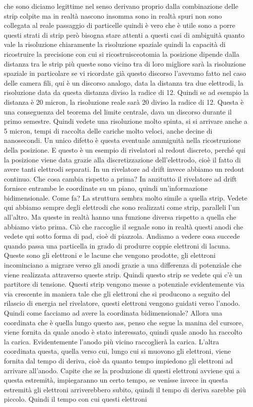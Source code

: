 che sono diciamo legittime nel senso derivano proprio dalla combinazione delle strip colpite ma in realtà nascono insomma sono in realtà spuri non sono collegata al reale passaggio di particelle quindi è vero che è utile sono a porre questi strati di strip però bisogna stare attenti a questi casi di ambiguità quanto vale la risoluzione chiaramente la risoluzione spaziale quindi la capacità di ricostruire la precisione con cui si ricostruisceotomia la posizione dipende dalla distanza tra le strip più queste sono vicino tra di loro migliore sarà la risoluzione spaziale in particolare se vi ricordate già questo discorso l'avevamo fatto nel caso delle camera fili, qui è un discorso analogo, data la distanza tra due elettrodi, la risoluzione data da questa distanza diviso la radice di 12. Quindi se ad esempio la distanza è 20 micron, la risoluzione reale sarà 20 diviso la radice di 12. Questa è una conseguenza del teorema del limite centrale, dava un discorso durante il primo semestre. Quindi vedete una risoluzione molto spinta, si si arrivare anche a 5 micron, tempi di raccolta delle cariche molto veloci, anche decine di nanosecondi. Un unico difetto è questa eventuale ammiguità nella ricostruzione della posizione. E questo è un esempio di rivelatori al redout discreto, perché qui la posizione viene data grazie alla discretizzazione dell'elettrodo, cioè il fatto di avere tanti elettrodi separati. In un rivelatore ad drift invece abbiamo un redout continuo. Che cosa cambia rispetto a prima? In anzitutto il rivelatore ad drift fornisce entrambe le coordinate su un piano, quindi un'informazione bidimensionale. Come fa? La struttura sembra molto simile a quella strip. Vedete qui abbiamo sempre degli elettrodi che sono realizzati come strip, paralleli l'un all'altro. Ma queste in realtà hanno una funzione diversa rispetto a quella che abbiamo visto prima. Ciò che raccoglie il segnale sono in realtà questi anodi che vedete qui sotto forma di pad, cioè di piazzola. Andiamo a vedere cosa succede quando passa una particella in grado di produrre coppie elettroni di lacuna. Queste sono gli elettroni e le lacune che vengono prodotte, gli elettroni incominciano a migrare verso gli anodi grazie a una differenza di potenziale che viene realizzata attraverso queste strip. Quindi questo strip se vedete qui c'è un partitore di tensione. Questi strip vengono messe a potenziale evidentemente via via crescente in maniera tale che gli elettroni che si producono a seguito del rilascio di energia nel rivelatore, questi elettroni vengono guidati verso l'anodo. Quindi come facciamo ad avere la coordinata bidimensionale? Allora una coordinata che è quella lungo questo ass, penso che segue la manina del cursore, viene fornita da quale anodo è stato interessato, quindi quale anodo ha raccolto la carica. Evidentemente l'anodo più vicino raccoglierà la carica. L'altra coordinata questa, quella verso cui, lungo cui si muovono gli elettroni, viene fornita dal tempo di deriva, cioè da quanto tempo impiedono gli elettroni ad arrivare all'anodo. Capite che se la produzione di questi elettroni avviene qui a questa estremità, impiegaranno un certo tempo, se venisse invece in questa estremità gli elettroni arriverebbero subito, quindi il tempo di deriva sarebbe più piccolo. Quindi il tempo con cui questi elettroni 